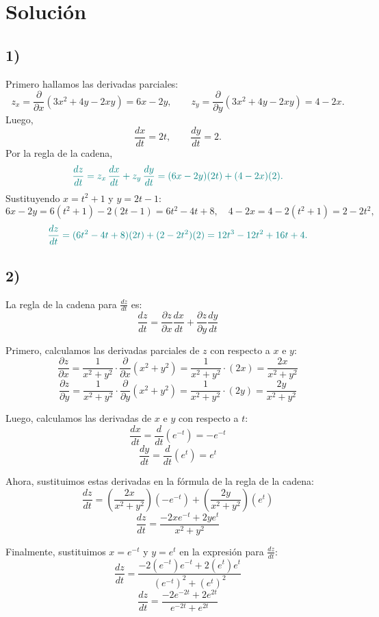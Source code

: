 \documentclass{article}
\begin{document}
\newpage
\section*{Solución}

\subsection*{1)}

Primero hallamos las derivadas parciales:
\[
z_x = \frac{\partial}{\partial x}(3x^2+4y-2xy) = 6x - 2y,
\qquad
z_y = \frac{\partial}{\partial y}(3x^2+4y-2xy) = 4 - 2x.
\]
Luego,
\[
\frac{dx}{dt} = 2t,
\qquad
\frac{dy}{dt} = 2.
\]
Por la regla de la cadena,
\[ \color{teal}
\frac{dz}{dt}
= z_x\,\frac{dx}{dt} + z_y\,\frac{dy}{dt}
= (6x-2y)(2t) + (4-2x)(2).
\]
Sustituyendo \(x=t^2+1\) y \(y=2t-1\):
\[
6x-2y = 6(t^2+1) - 2(2t-1) = 6t^2 -4t +8,
\quad
4-2x = 4 - 2(t^2+1) = 2 - 2t^2,
\]
\[ \color{teal}
\frac{dz}{dt}
= (6t^2 -4t +8)(2t) + (2 - 2t^2)(2)
= 12t^3 -12t^2 +16t +4.
\]

\subsection*{2)}


La regla de la cadena para $\frac{dz}{dt}$ es:
\[
\frac{dz}{dt} = \frac{\partial z}{\partial x} \frac{dx}{dt} + \frac{\partial z}{\partial y} \frac{dy}{dt}
\]

Primero, calculamos las derivadas parciales de $z$ con respecto a $x$ e $y$:
\[
\frac{\partial z}{\partial x} = \frac{1}{x^2 + y^2} \cdot \frac{\partial}{\partial x}(x^2 + y^2) = \frac{1}{x^2 + y^2} \cdot (2x) = \frac{2x}{x^2 + y^2}
\]
\[
\frac{\partial z}{\partial y} = \frac{1}{x^2 + y^2} \cdot \frac{\partial}{\partial y}(x^2 + y^2) = \frac{1}{x^2 + y^2} \cdot (2y) = \frac{2y}{x^2 + y^2}
\]

Luego, calculamos las derivadas de $x$ e $y$ con respecto a $t$:
\[
\frac{dx}{dt} = \frac{d}{dt}(e^{-t}) = -e^{-t}
\]
\[
\frac{dy}{dt} = \frac{d}{dt}(e^{t}) = e^{t}
\]

Ahora, sustituimos estas derivadas en la fórmula de la regla de la cadena:
\[
\frac{dz}{dt} = \left(\frac{2x}{x^2 + y^2}\right)(-e^{-t}) + \left(\frac{2y}{x^2 + y^2}\right)(e^{t})
\]
\[
\frac{dz}{dt} = \frac{-2xe^{-t} + 2ye^{t}}{x^2 + y^2}
\]

Finalmente, sustituimos $x = e^{-t}$ y $y = e^{t}$ en la expresión para $\frac{dz}{dt}$:
\[
\frac{dz}{dt} = \frac{-2(e^{-t})e^{-t} + 2(e^{t})e^{t}}{(e^{-t})^2 + (e^{t})^2}
\]
\[
\frac{dz}{dt} = \frac{-2e^{-2t} + 2e^{2t}}{e^{-2t} + e^{2t}}
\]
\end{document}
